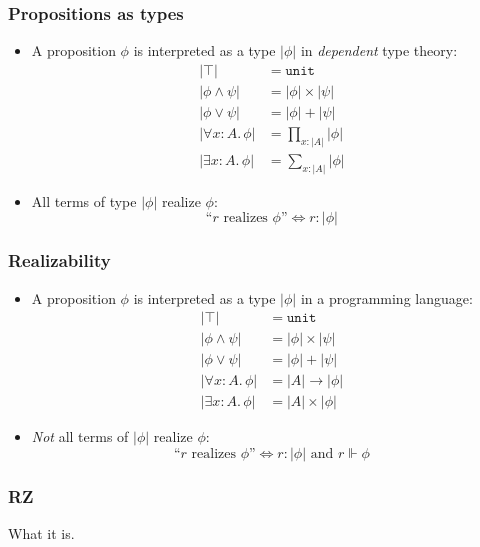\documentclass[t]{beamer}
\begin{document}
\begin{frame}
  \frametitle{Propositions as types}

  \begin{itemize}
  \item A proposition $\phi$ is interpreted as a type $|\phi|$ in
    \emph{dependent} type theory:
    \begin{align*}
      |\top| &= \mathtt{unit} \\
      |\phi \land \psi| &= |\phi| \times |\psi| \\
      |\phi \lor \psi| &= |\phi| + |\psi| \\
      |\forall x : A .\, \phi| &= \textstyle\prod_{x : |A|} |\phi| \\
      |\exists x : A .\, \phi| &= \textstyle\sum_{x : |A|} |\phi|
    \end{align*}
  \item All terms of type $|\phi|$ realize $\phi$:
    \begin{equation*}
      \text{``$r$ realizes $\phi$''} \iff r : |\phi|
    \end{equation*}
  \end{itemize}
\end{frame}

\begin{frame}
  \frametitle{Realizability}

  \begin{itemize}
  \item A proposition $\phi$ is interpreted as a type $|\phi|$ in a
    programming language:
    \begin{align*}
      |\top| &= \mathtt{unit} \\
      |\phi \land \psi| &= |\phi| \times |\psi| \\
      |\phi \lor \psi| &= |\phi| + |\psi| \\
      |\forall x : A .\, \phi| &= |A| \to |\phi| \\
      |\exists x : A .\, \phi| &= |A| \times |\phi|
    \end{align*}
  \item \emph{Not} all terms of $|\phi|$ realize $\phi$:
    \begin{equation*}
      \text{``$r$ realizes $\phi$''} \iff \text{$r : |\phi|$ and $r \Vdash \phi$}
    \end{equation*}
  \end{itemize}
\end{frame}

\begin{frame}
  \frametitle{RZ}

  What it is.
\end{frame}
\end{document}
